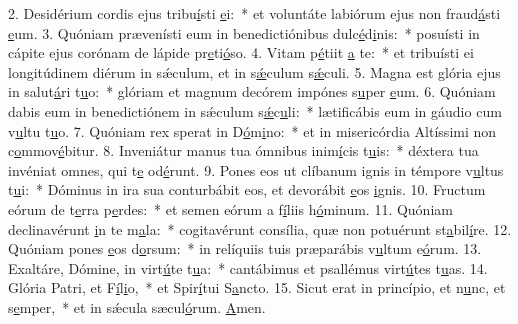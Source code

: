 2. Desidérium cordis ejus tribu\uline{í}sti \uline{e}i:~* et voluntáte labiórum ejus non fraud\uline{á}sti \uline{e}um.
3. Quóniam prævenísti eum in benedictiónibus dulc\uline{é}d\uline{i}nis:~* posuísti in cápite ejus corónam de lápide pr\uline{e}ti\uline{ó}so.
4. Vitam p\uline{é}tiit \uline{a} te:~* et tribuísti ei longitúdinem diérum in sǽculum, et in s\uline{ǽ}culum s\uline{ǽ}culi.
5. Magna est glória ejus in salut\uline{á}ri t\uline{u}o:~* glóriam et magnum decórem impónes s\uline{u}per \uline{e}um.
6. Quóniam dabis eum in benedictiónem in sǽculum s\uline{ǽ}c\uline{u}li:~* lætificábis eum in gáudio cum v\uline{u}ltu t\uline{u}o.
7. Quóniam rex sperat in D\uline{ó}m\uline{i}no:~* et in misericórdia Altíssimi non c\uline{o}mmov\uline{é}bitur.
8. Inveniátur manus tua ómnibus inim\uline{í}cis t\uline{u}is:~* déxtera tua invéniat omnes, qui t\uline{e} od\uline{é}runt.
9. Pones eos ut clíbanum ignis in témpore v\uline{u}ltus t\uline{u}i:~* Dóminus in ira sua conturbábit eos, et devorábit \uline{e}os \uline{i}gnis.
10. Fructum eórum de t\uline{e}rra p\uline{e}rdes:~* et semen eórum a f\uline{í}liis h\uline{ó}minum.
11. Quóniam declinavérunt \uline{i}n te m\uline{a}la:~* cogitavérunt consília, quæ non potuérunt st\uline{a}bil\uline{í}re.
12. Quóniam pones \uline{e}os d\uline{o}rsum:~* in relíquiis tuis præparábis v\uline{u}ltum e\uline{ó}rum.
13. Exaltáre, Dómine, in virt\uline{ú}te t\uline{u}a:~* cantábimus et psallémus virt\uline{ú}tes t\uline{u}as.
14. Glória Patri, et F\uline{í}l\uline{i}o,~* et Spir\uline{í}tui S\uline{a}ncto.
15. Sicut erat in princípio, et n\uline{u}nc, et s\uline{e}mper,~* et in sǽcula sæcul\uline{ó}rum. \uline{A}men.
